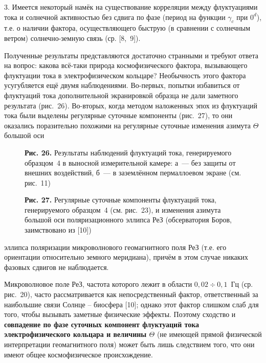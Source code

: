 \documentclass[12pt,a4paper]{article}
\begin{document}
3. Имеется некоторый намёк на существование корреляции между флуктуациями
тока и солнечной активностью без сдвига по фазе (период на функции $\gamma_c$
при $0^d$), т.е. о наличии фактора, осуществляющего быструю (в сравнении с
солнечным ветром) солнечно-земную связь (ср. [8,~9]).

Полученные результаты представляются достаточно странными и требуют ответа на
вопрос: какова всё-таки природа космофизического фактора, вызывающего флуктуации
тока в электрофизическом кольцаре? Необычность этого фактора усугубляется ещё
двумя наблюдениями. Во-первых, попытки избавиться от флуктуаций тока
дополнительной экранировкой образца не дали заметного результата (рис.~26).
Во-вторых, когда методом наложенных эпох из флуктуаций тока были выделены
регулярные суточные компоненты (рис.~27), то они оказались поразительно
похожими на регулярные суточные изменения азимута $\Theta$ большой оси

\begin{figure}[h]
\centering
\caption*{\textbf{Рис. 26.} Результаты наблюдений флуктуаций тока, генерируемого
образцом~4 в выносной измерительной камере: а~— без защиты от внешних
воздействий, б~— в заземлённом пермаллоевом экране (см. рис.~11)}
\end{figure}

\begin{figure}[h]
\centering
\caption*{\textbf{Рис. 27.} Регулярные суточные компоненты флуктуаций тока,
генерируемого образцом~4 (см. рис.~23), и изменения азимута большой оси
поляризационного эллипса РеЗ (обсерватория Боров, заимствовано из [10])}
\end{figure}

\newpage

эллипса поляризации микроволнового геомагнитного поля РеЗ (т.е. его
ориентации относительно земного меридиана), причём в этом случае никаких
фазовых сдвигов не наблюдается.

Микроволновое поле РеЗ, частота которого лежит в области $0{,}02 \div 0{,}1$~Гц
(ср. рис.~20), часто рассматривается как непосредственный фактор, ответственный
за наибольшие связи Солнце -- биосфера [10]; однако этот фактор слишком слаб
для того, чтобы вызывать заметные физические эффекты. Поэтому сходство и
\textbf{совпадение по фазе суточных компонент флуктуаций тока электрофизического
кольцара и величины $\Theta$} (не имеющей прямой физической интерпретации
геомагнитного поля) может быть лишь следствием того, что они имеют общее
космофизическое происхождение.
\end{document}

